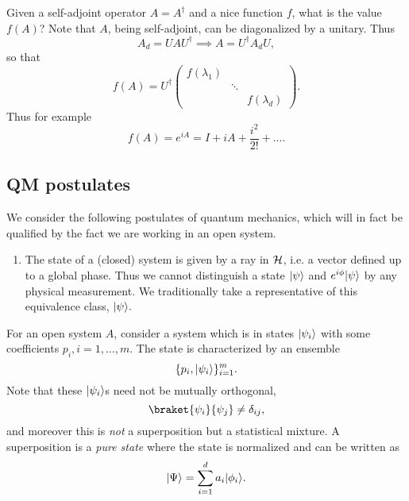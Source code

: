 Given a self-adjoint operator $A=A^\dagger$ and a nice function $f$, what is the value $f(A)$? Note that $A$, being self-adjoint, can be diagonalized by a unitary. Thus
\begin{equation}
    A_d = UAU^\dagger \implies A = U^\dagger A_d U,
\end{equation}
so that
\begin{equation}
    f(A)=U^\dagger \begin{pmatrix}
    f(\lambda_1) && \\
    & \ddots & \\
    && f(\lambda_d)
    \end{pmatrix}.
\end{equation}
Thus for example
\begin{equation*}
    f(A)=e^{iA}=I + iA +\frac{i^2}{2!}+\ldots.
\end{equation*}

\subsection*{QM postulates}
We consider the following postulates of quantum mechanics, which will in fact be qualified by the fact we are working in an open system.
\begin{enumerate}
    \item The state of a (closed) system is given by a ray in $\mathcal H$, i.e. a vector defined up to a global phase. Thus we cannot distinguish a state $\lvert\psi\rangle$ and $e^{i\phi}\lvert\psi\rangle$ by any physical measurement. We traditionally take a representative of this equivalence class, $\lvert\psi\rangle.$
\end{enumerate}
For an open system $A$, consider a system which is in states $\lvert\psi_i\rangle$ with some coefficients $p_i, i=1,\ldots, m$. The state is characterized by an ensemble
\begin{equation}
    \{p_i,\lvert\psi_i\rangle\}_{i=1}^m.
\end{equation}
Note that these $\lvert\psi_i\rangle$s need not be mutually orthogonal,
\begin{equation}
    \braket{\psi_i}{\psi_j}\neq \delta_{ij},
\end{equation}
and moreover this is \emph{not} a superposition but a statistical mixture. A superposition is a \emph{pure state} where the state is normalized and can be written as 
\begin{equation}
    \lvert\Psi\rangle=\sum_{i=1}^d a_i \lvert\phi_i\rangle.
\end{equation}


